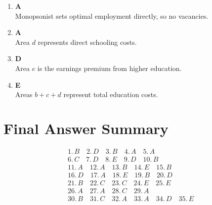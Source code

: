 \documentclass[12pt]{article}
\begin{document}
\begin{enumerate}
\item \textbf{A} \\
Monopsonist sets optimal employment directly, so no vacancies.

\item \textbf{A} \\
Area $d$ represents direct schooling costs.

\item \textbf{D} \\
Area $e$ is the earnings premium from higher education.

\item \textbf{E} \\
Areas $b + c + d$ represent total education costs.

\end{enumerate}

\section*{Final Answer Summary}

\[
\begin{aligned}
&1.\,B \quad 2.\,D \quad 3.\,B \quad 4.\,A \quad 5.\,A \\
&6.\,C \quad 7.\,D \quad 8.\,E \quad 9.\,D \quad 10.\,B \\
&11.\,A \quad 12.\,A \quad 13.\,B \quad 14.\,E \quad 15.\,B \\
&16.\,D \quad 17.\,A \quad 18.\,E \quad 19.\,B \quad 20.\,D \\
&21.\,B \quad 22.\,C \quad 23.\,C \quad 24.\,E \quad 25.\,E \\
&26.\,A \quad 27.\,A \quad 28.\,C \quad 29.\,A \\
&30.\,B \quad 31.\,C \quad 32.\,A \quad 33.\,A \quad 34.\,D \quad 35.\,E
\end{aligned}
\]
\end{document}
